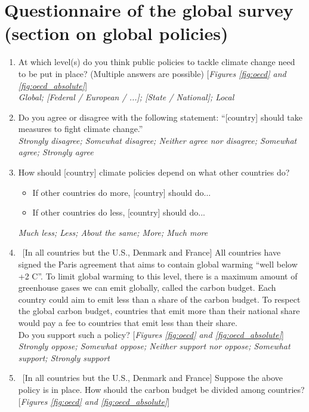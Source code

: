 \documentclass[12pt,english]{article}
\begin{document}
\clearpage 
\section{Questionnaire of the global survey (section on global policies)}\label{app:questionnaire_oecd}
\renewcommand{\theenumi}{\Alph{enumi}}
\begin{enumerate} \item \label{q:scale} At which level(s) do you think public policies to tackle climate change need to be put in place? (Multiple answers are possible) [\textit{Figures \ref{fig:oecd} and \ref{fig:oecd_absolute}}]
\\ \textit{Global; [Federal / European / ...]; [State / National]; Local}
\item Do you agree or disagree with the following statement: ``[country] should take measures to fight climate change.''%
	\\ \textit{Strongly disagree; Somewhat disagree; Neither agree nor disagree; Somewhat agree; Strongly agree}
\item How should [country] climate policies depend on what other countries do?%
 \begin{itemize}
\item If other countries do more, [country] should do...
\item If other countries do less, [country] should do...
\end{itemize}
\textit{Much less; Less; About the same; More; Much more}
\item ~[In all countries but the U.S., Denmark and France]  All countries have signed the Paris agreement that aims to contain global warming ``well below +2 \textdegree{}C''. To limit global warming to this level, there is a maximum amount of greenhouse gases we can emit globally, called the carbon budget. Each country could aim to emit less than a share of the carbon budget. To respect the global carbon budget, countries that emit more than their national share would pay a fee to countries that emit less than their share. \\ 
Do you support such a policy? [\textit{Figures \ref{fig:oecd} and \ref{fig:oecd_absolute}}]
\\ \textit{Strongly oppose; Somewhat oppose; Neither support nor oppose; Somewhat support; Strongly support}
\item ~[In all countries but the U.S., Denmark and France] Suppose the above policy is in place. How should the carbon budget be divided among countries? [\textit{Figures \ref{fig:oecd} and \ref{fig:oecd_absolute}}]

\end{enumerate}
\end{document}
